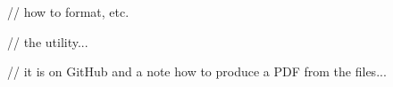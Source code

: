 
// how to format, etc.

// the utility...

// it is on GitHub and a note how to produce a PDF from the files...


